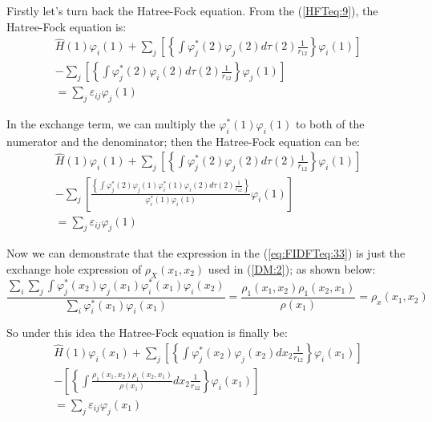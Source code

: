 Firstly let's turn back the Hatree-Fock equation. From the
(\ref{HFTeq:9}), the Hatree-Fock equation is:
\begin{multline}\label{eq:FIDFTeq:33}
  \hat{H}(1)\varphi_{i}(1) + \sum_{j}\left[
    \left\{\int\varphi^{*}_{j}(2)\varphi_{j}(2)d\tau(2)\frac{1}{r_{12}}\right\}\varphi_{i}(1)
  \right] \\
  - \sum_{j}\left[
    \left\{\int\varphi^{*}_{j}(2)\varphi_{i}(2)d\tau(2)\frac{1}{r_{12}}\right\}\varphi_{j}(1)
  \right] \\
  = \sum_{j} \varepsilon_{ij}\varphi_{j}(1)
\end{multline}

In the exchange term, we can multiply the
$\varphi^{*}_{i}(1)\varphi_{i}(1)$ to both of the numerator and the
denominator; then the Hatree-Fock equation can be:
\begin{multline}\label{eq:FIDFTeq:34}
  \hat{H}(1)\varphi_{i}(1) + \sum_{j}\left[
    \left\{\int\varphi^{*}_{j}(2)\varphi_{j}(2)d\tau(2)\frac{1}{r_{12}}\right\}\varphi_{i}(1)
  \right] \\
  - \sum_{j}\left[
    \frac{\left\{\int\varphi^{*}_{j}(2)\varphi_{j}(1)\varphi^{*}_{i}(1)\varphi_{i}(2)d\tau(2)
        \frac{1}{r_{12}}\right\}}{\varphi^{*}_{i}(1)\varphi_{i}(1)}\varphi_{i}(1)
  \right] \\
  = \sum_{j} \varepsilon_{ij}\varphi_{j}(1)
\end{multline}

Now we can demonstrate that the expression in the
(\ref{eq:FIDFTeq:33}) is just the exchange hole expression of
$\rho_{X}(x_{1}, x_{2})$ used in (\ref{DM:2}); as shown below:
\begin{equation}
  \label{eq:FIDFTeq:35}
  \frac{\sum_{i}\sum_{j}\int\varphi^{*}_{j}(x_{2})\varphi_{j}(x_{1})
    \varphi^{*}_{i}(x_{1})\varphi_{i}(x_{2})}
  {\sum_{i}\varphi^{*}_{i}(x_{1})\varphi_{i}(x_{1})}
  =\frac{\rho_{1}(x_{1},x_{2})\rho_{1}(x_{2},x_{1})}{\rho(x_{1})} =
  \rho_{x}(x_{1},x_{2}) 
\end{equation}

So under this idea the Hatree-Fock equation is finally be:
\begin{multline}\label{eq:FIDFTeq:36}
  \hat{H}(1)\varphi_{i}(x_{1}) + \sum_{j}\left[
    \left\{\int\varphi^{*}_{j}(x_{2})\varphi_{j}(x_{2})dx_{2}\frac{1}{r_{12}}
    \right\}\varphi_{i}(x_{1})
  \right] \\
  - \left[
    \left\{\int\frac{\rho_{1}(x_{1},x_{2})\rho_{1}(x_{2},x_{1})}{\rho(x_{1})}
      dx_{2}\frac{1}{r_{12}}\right\}\varphi_{i}(x_{1})
  \right] \\
  = \sum_{j} \varepsilon_{ij}\varphi_{j}(x_{1})
\end{multline}

